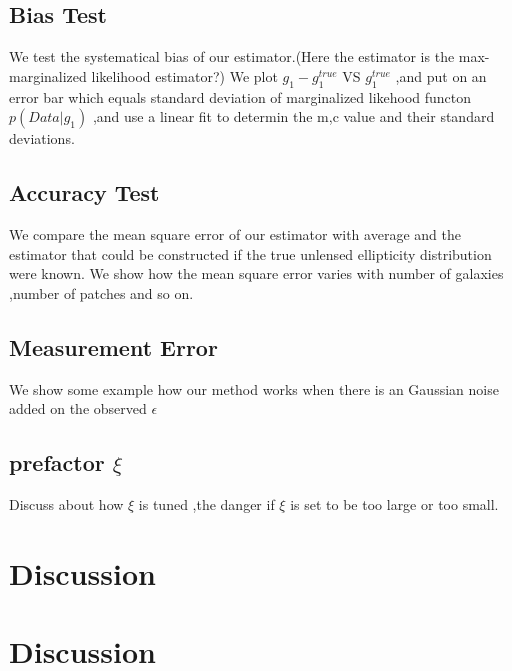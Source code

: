 \documentclass[useAMS,usenatbib]{mn2e}
\begin{document}
\subsection{Bias Test}
We test the systematical bias of our estimator.(Here the estimator is the max-marginalized likelihood estimator?)
We plot $g_{1}-g_{1}^{true}$ VS $g_{1}^{true}$ ,and put on an error bar which equals standard deviation of 
marginalized likehood functon $p(Data|g_{1})$ ,and use a linear fit to determin the m,c value and their standard 
deviations.

\subsection{Accuracy Test}
We compare the mean square error of our estimator with average and the estimator that could be constructed if the true unlensed
ellipticity distribution were known.
We show how the mean square error varies with number of galaxies ,number of patches and so on.

\subsection{Measurement Error}
We show some example how our method works when there is an Gaussian noise added on the observed $\epsilon$

\subsection{prefactor $\xi$}
Discuss about how $\xi$ is tuned ,the danger if $\xi$ is set to be too large or too small. 






\section{Discussion}
\label{sec:XXX}



\section{Discussion}
\label{sec:discuss}
\end{document}

